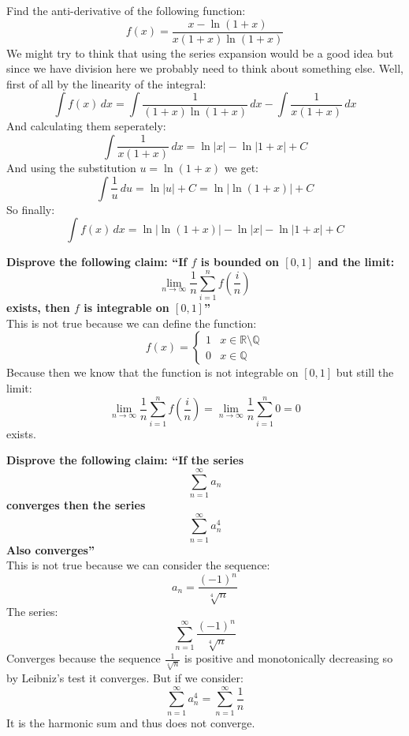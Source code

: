 \documentclass{article}
\theoremstyle{plain}
\newcommand{\Q}{\mathbb{Q}}
\newcommand{\R}{\mathbb{R}}
\begin{document}
	\newpage
	Find the anti-derivative of the following function:
	\[
		f(x) = \frac{x - \ln(1+x)}{x(1+x)\ln(1+x)}
	\]
	We might try to think that using the series expansion would be a good
	idea but since we have division here we probably need to think about
	something else. Well, first of all by the linearity of the integral:
	\[
		\int{f(x)\,dx} = 
		\int\frac{1}{(1+x)\ln(1+x)}\,dx -
		\int\frac{1}{x(1+x)}\,dx
	\]
	And calculating them seperately:
	\[
		\int\frac{1}{x(1+x)}\,dx = \ln|x| - \ln|1+x| + C
	\]
	And using the substitution $u = \ln(1+x)$ we get:
	\[
		\int\frac{1}{u}\,du = \ln|u| + C = \ln|\ln(1+x)| + C
	\]
	So finally:
	\[
		\int{f(x)\,dx} = \ln|\ln(1+x)| - \ln|x| - \ln|1+x| + C
	\]
	
	\newpage
	\textbf{
	Disprove the following claim: ``If $f$ is bounded on $[0,1]$ and the 
	limit:
	\[
		\lim_{n\to\infty}
		{\frac{1}{n}\sum_{i=1}^{n}{f\left(\frac{i}{n}\right)}}
	\]
	exists, then $f$ is integrable on $[0,1]$''} \\
	This is not true because we can define the function:
	\[
		f(x) = \begin{cases}
		1 &x\in\R\setminus\Q \\
		0 &x\in\Q
		\end{cases}
	\]
	Because then we know that the function is not integrable on $[0,1]$
	but still the limit:
	\[
		\lim_{n\to\infty}
		{\frac{1}{n}\sum_{i=1}^{n}{f\left(\frac{i}{n}\right)}} = 
		\lim_{n\to\infty}
		{\frac{1}{n}\sum_{i=1}^{n}{0}} = 0
	\]
	exists.
	
	\newpage
	
	\textbf{
	Disprove the following claim: ``If the series
	\[
		\sum_{n=1}^{\infty}{a_n}
	\]
	converges then the series
	\[
		\sum_{n=1}^{\infty}{a_n^4}
	\]
	Also converges''} \\
	This is not true because we can consider the sequence:
	\[
		a_n = \frac{(-1)^n}{\sqrt[4]{n}}
	\]
	The series:
	\[
		\sum_{n=1}^{\infty}{\frac{(-1)^n}{\sqrt[4]{n}}}
	\]
	Converges because the sequence $\frac{1}{\sqrt[4]{n}}$ is positive
	and monotonically decreasing so by Leibniz's test it converges. But
	if we consider:
	\[
		\sum_{n=1}^{\infty}{a_n^4} = 
		\sum_{n=1}^{\infty}{\frac{1}{n}}
	\]
	It is the harmonic sum and thus does not converge.
	
	\newpage
	
\end{document}
